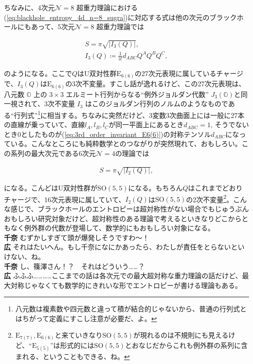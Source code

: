 \documentclass[paper=b5j,fontsize=12Q,jafontsize=12Q,baselineskip=21Q]{jlreq}
\DeclareRobustCommand{\hiron}{\textbf{広 }}
\DeclareRobustCommand{\chinan}{\textbf{千奈 }}
\begin{document}
\begin{refsection}
ちなみに、4次元$\mathcal{N}=8$ 超重力理論における(\ref{eq:blackhole_entropy_4d_n=8_sugra})に対応する式は他の次元のブラックホールにもあって、5次元$\mathcal{N}=8$ 超重力理論では
\begin{tcolorbox}
\begin{gather}
  S=\pi\sqrt{|I_3(Q)|},\\
  I_3(Q)\coloneqq\frac1{3!}d_{ABC}Q^AQ^BQ^C,\label{eq:3rd_order_invariant_E6(6)}
\end{gather}
\end{tcolorbox}
のようになる。ここで$Q$はU双対性群$\mathrm E_{6(6)}$の27次元表現に属しているチャージで、$I_3(Q)$は$\mathrm E_{6(6)}$の3次不変量。すこし話が逸れるけど、この27次元表現は、八元数 $\mathbb{O}$ 上の $3 \times 3$ エルミート行列からなる``例外ジョルダン代数'' $J_3(\mathbb{O})$と同一視されて、3次不変量 $I_3$ はこのジョルダン行列のノルムのようなものである``行列式''\footnote{八元数は複素数や四元数と違って積が結合的じゃないから、普通の行列式とはちがって定義にすこし注意が必要だ、よ。}に相当する。ちなみに突然だけど、3変数3次曲面上には一般に27本の直線が乗っていて、直線$l_A,l_B,l_C$が同一平面上にあるとき$d_{ABC}=1$, そうでないとき0としたものが(\ref{eq:3rd_order_invariant_E6(6)})の対称テンソル$d_{ABC}$になっている。こんなところにも純粋数学とのつながりが突然現れて、おもしろい。この系列の最大次元である6次元$\mathcal{N}=4$の理論では
\begin{tcolorbox}
\begin{gather}
  S=\pi\sqrt{|I_2(Q)|},
\end{gather}
\end{tcolorbox}
になる。こんどはU双対性群が$\mathrm{SO}(5,5)$になる。もちろん$Q$はこれまでどおりチャージで、16次元表現に属していて、$I_2(Q)$は$\mathrm{SO}(5,5)$の2次不変量\footnote{$\mathrm E_{7(7)},\mathrm E_{6(6)}$と来ていきなり$\mathrm{SO}(5,5)$が現れるのは不規則にも見えるけど、``$\mathrm E_{5(5)}$''は形式的には$\mathrm{SO}(5,5)$とおなじだからこれも例外群の系列に含まれる、ということもできる、ね。}。こんな感じで、ブラックホールのエントロピーは超対称性がない場合でもじゅうぶんおもしろい研究対象だけど、超対称性のある理論で考えるといきなりどこからともなく例外群の代数が登場して、数学的にもおもしろい対象になる。
\\\chinan むずかしすぎて頭が爆発しそうですわ〜！
\\\hiron それはたいへん。もし千奈になにかあったら、わたしが責任をとらないといけない、ね。
\\\chinan し、篠澤さん！？　それはどういう……？
\\\hiron ふふふ…………ここまでの話は各次元での最大超対称な重力理論の話だけど、最大対称じゃなくても数学的にきれいな形でエントロピーが書ける理論もある。

\end{refsection}
\end{document}
